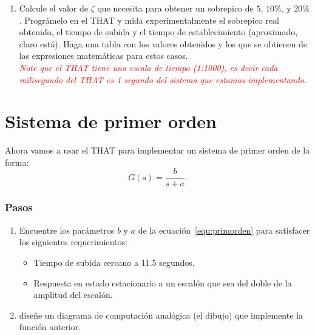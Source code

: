 \documentclass[]{scrartcl}
\begin{document}
\begin{enumerate}[label=\alph*)]
\begin{enumerate}
	
	
	\item \textcolor{bitacora}{Calcule el valor de $\zeta$ que necesita para obtener un sobrepico de $5$, $10\%$, y $20\%$. Prográmelo en el THAT y mida experimentalmente el sobrepico real obtenido, el tiempo de subida y el tiempo de establecimiento (aproximado, claro está). Haga una tabla con los valores obtenidos y los que se obtienen de las expresiones matemáticas para estos casos.} \\
	

	
	\textcolor{red}{\emph{Note que el THAT tiene una escala de tiempo (1:1000), es decir cada milisegundo del THAT es 1 segundo del sistema que estamos implementando.}}
\end{enumerate}

\section{Sistema de primer orden} 

Ahora vamos a usar el THAT para implementar un sistema de primer orden de la forma: 
\begin{equation}
 G(s)=\dfrac{b}{s+a}.
 \label{equ:primorden}
 \end{equation}
 
\subsubsection*{Pasos}

\begin{enumerate}
	
	\item  \textcolor{bitacora}{Encuentre los parámetros $b$ y $a$ de la ecuación~\ref{equ:primorden} para satisfacer los siguientes requerimientos:}
	\begin{itemize}
		\item Tiempo de subida cercano a 11.5 segundos.
		\item Respuesta en estado estacionario a un escalón que sea del doble de la amplitud del escalón.
	\end{itemize}
	
	\item \textcolor{bitacora}{diseñe un diagrama de computación analógica (el dibujo) que implemente la función anterior.}
	

\end{enumerate}
\end{enumerate}
\end{document}
